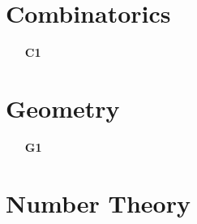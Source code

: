 \documentclass[11pt,a4paper]{article}
\begin{document}
\section{Combinatorics}
\begin{enumerate}
	\item[\textbf{C1}]
\end{enumerate}

\section{Geometry}
\begin{enumerate}
	\item[\textbf{G1}]
\end{enumerate}

\section{Number Theory}
\end{document}
